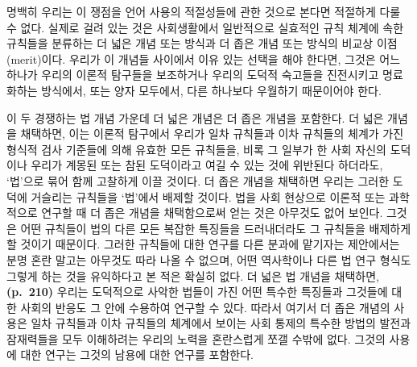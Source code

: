 명백히 우리는 이 쟁점을 언어 사용의 적절성들에 관한 것으로 본다면
적절하게 다룰 수 없다. 실제로 걸려 있는 것은 사회생활에서 일반적으로
실효적인 규칙 체계에 속한 규칙들을 분류하는 더 넓은 개념 또는 방식과 더
좁은 개념 또는 방식의 비교상 이점(merit)이다. 우리가 이 개념들 사이에서
이유 있는 선택을 해야 한다면, 그것은 어느 하나가 우리의 이론적 탐구들을
보조하거나 우리의 도덕적 숙고들을 진전시키고 명료화하는 방식에서, 또는
양자 모두에서, 다른 하나보다 우월하기 때문이어야 한다.

이 두 경쟁하는 법 개념 가운데 더 넓은 개념은 더 좁은 개념을 포함한다. 더
넓은 개념을 채택하면, 이는 이론적 탐구에서 우리가 일차 규칙들과 이차
규칙들의 체계가 가진 형식적 검사 기준들에 의해 유효한 모든 규칙들을,
비록 그 일부가 한 사회 자신의 도덕이나 우리가 계몽된 또는 참된
도덕이라고 여길 수 있는 것에 위반된다 하더라도, ‘법’으로 묶어 함께
고찰하게 이끌 것이다. 더 좁은 개념을 채택하면 우리는 그러한 도덕에
거슬리는 규칙들을 ‘법’에서 배제할 것이다. 법을 사회 현상으로 이론적 또는
과학적으로 연구할 때 더 좁은 개념을 채택함으로써 얻는 것은 아무것도 없어
보인다. 그것은 어떤 규칙들이 법의 다른 모든 복잡한 특징들을 드러내더라도
그 규칙들을 배제하게 할 것이기 때문이다. 그러한 규칙들에 대한 연구를
다른 분과에 맡기자는 제안에서는 분명 혼란 말고는 아무것도 따라 나올 수
없으며, 어떤 역사학이나 다른 법 연구 형식도 그렇게 하는 것을 유익하다고
본 적은 확실히 없다. 더 넓은 법 개념을 채택하면, \textbf{(p.~210)}
우리는 도덕적으로 사악한 법들이 가진 어떤 특수한 특징들과 그것들에 대한
사회의 반응도 그 안에 수용하여 연구할 수 있다. 따라서 여기서 더 좁은
개념의 사용은 일차 규칙들과 이차 규칙들의 체계에서 보이는 사회 통제의
특수한 방법의 발전과 잠재력들을 모두 이해하려는 우리의 노력을 혼란스럽게
쪼갤 수밖에 없다. 그것의 사용에 대한 연구는 그것의 남용에 대한 연구를
포함한다.

